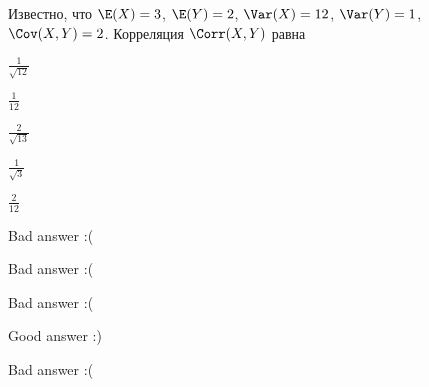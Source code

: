 
\begin{question}
Известно, что \(\E(X)=3\), \(\E(Y)=2\), \(\Var(X)=12\), \(\Var(Y)=1\),
\(\Cov(X,Y)=2\). Корреляция \(\Corr(X,Y)\) равна
\begin{answerlist}
  \item \(\frac{1}{\sqrt{12}}\)
  \item \(\frac{1}{12}\)
  \item \(\frac{2}{\sqrt{13}}\)
  \item \(\frac{1}{\sqrt{3}}\)
  \item \(\frac{2}{12}\)
\end{answerlist}
\end{question}

\begin{solution}
\begin{answerlist}
  \item Bad answer :(
  \item Bad answer :(
  \item Bad answer :(
  \item Good answer :)
  \item Bad answer :(
\end{answerlist}
\end{solution}

